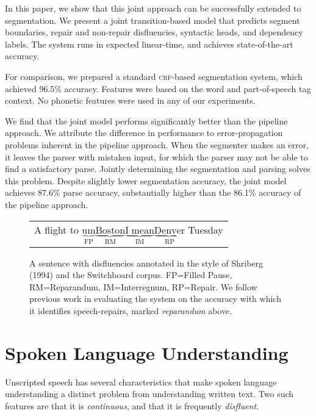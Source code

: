 \documentclass[11pt,letterpaper]{article}
\begin{document}
In this paper, we show that this joint approach can be successfully extended
to segmentation.  We present a joint transition-based model that predicts
segment boundaries, repair and non-repair disfluencies, syntactic heads, and
dependency labels.  The system runs in expected linear-time, and achieves
state-of-the-art accuracy.

For comparison, we prepared a standard \textsc{crf}-based segmentation system,
which achieved 96.5\% accuracy.  Features were based on the word and part-of-speech
tag context.  No phonetic features were used in any of our experiments.

We find that the joint model performs significantly better than the pipeline approach.
We attribute the difference in performance to error-propagation
problems inherent in the pipeline approach.  When the segmenter makes an error,
it leaves the parser with mistaken input, for which the parser may not be able
to find a satisfactory parse.  Jointly determining the segmentation and parsing
solves this problem.  Despite slightly lower segmentation accuracy, the joint
model achieves 87.6\% parse accuracy, substantially higher than the 86.1\%
accuracy of the pipeline approach.

\begin{figure}
    \begin{tabular}{l}

        A flight to $\underbrace{\mathrm{um}}_\text{FP} \underbrace{\mathrm{Boston}}_\text{RM} \underbrace{\mathrm{I\;mean}}_\text{IM} \underbrace{\mathrm{Denver}}_\text{RP}$ Tuesday\\

\end{tabular}
\caption{\small A sentence with disfluencies annotated in the style of Shriberg (1994) 
    and the Switchboard corpus.
FP=Filled Pause, RM=Reparandum, IM=Interregnum, RP=Repair.
We follow previous work in evaluating the system on the accuracy with which
it identifies speech-repairs, marked \emph{reparandum} above.
\label{fig:shriberg}}
\end{figure}


\section{Spoken Language Understanding}

Unscripted speech has several characteristics that make spoken language understanding
a distinct problem from understanding written text.  Two such features are that
it is \emph{continuous}, and that it is frequently \emph{disfluent}.
\end{document}
